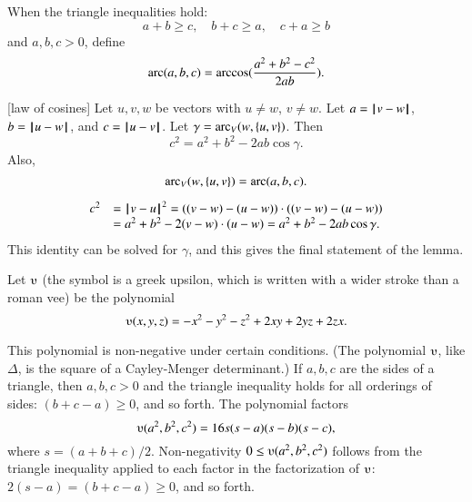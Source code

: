 
\begin{definition}[arc]
When the triangle inequalities hold:
$$
a + b \ge c,\quad b + c \ge a, \quad c+a \ge b
$$
and $a,b,c >0$, define
 $$\operatorname{arc}(a,b,c) = \arccos(\frac{a^2 + b^2 - c^2}{2 a b}).$$
%
\end{definition}

\begin{lemma}[law of cosines]
Let $u,v,w$ be vectors with $u\ne w$, $v\ne w$.  Let $a
    = {\hskip0.1em|\hskip-0.15em|\hskip0.1em}v  -  w{\hskip0.1em|\hskip-0.15em|\hskip0.1em}$, $b = {\hskip0.1em|\hskip-0.15em|\hskip0.1em}u  -  w{\hskip0.1em|\hskip-0.15em|\hskip0.1em}$, and $c = {\hskip0.1em|\hskip-0.15em|\hskip0.1em}u  -  v{\hskip0.1em|\hskip-0.15em|\hskip0.1em}$.
    Let $\gamma=\operatorname{arc}_V(w,\{u,v\})$.    Then
        $$c^2 = a^2 + b^2 - 2 a b \cos\gamma.$$
Also,
$$
\operatorname{arc}_V(w,\{u,v\})= \operatorname{arc}(a,b,c).
$$

\end{lemma}
%
%
%
%
\begin{proved}
    $$\begin{array}{lll}c^2 &= {\hskip0.1em|\hskip-0.15em|\hskip0.1em}v  -  u{\hskip0.1em|\hskip-0.15em|\hskip0.1em}^2 = ((v - w) - (u - w))\cdot ((v - w) - (u -
    w)) \\ &= a^2 + b^2 - 2 (v - w)\cdot (u - w) = a^2 +b ^2 - 2 a b
    \cos\gamma.
    \end{array}$$
This identity can be solved for $\gamma$, and this gives the final statement of the lemma.
\swallowed\end{proved}


\begin{definition}[$\ups$]\label{def:ups}
Let $\ups$ (the symbol is a greek upsilon, which is written with a
wider stroke than a roman vee) be the polynomial
    $$\ups(x,y,z) = -x^2 - y^2 - z^2 + 2 x y + 2 y z + 2 z x.$$
%
\end{definition}



This polynomial is non-negative under certain conditions. (The polynomial
$\ups$, like $\Delta$, 
is the square of a Cayley-Menger determinant.)  
If $a,b,c$ are the sides of a triangle, then $a,b,c>0$ and the triangle
inequality holds for all orderings of sides: $(b+c-a)\ge 0$, and so forth.
The polynomial factors
    $$\ups(a^2,b^2,c^2) = 16 s (s-a) (s-b) (s-c),$$
where $s = (a+b+c)/2$.
Non-negativity $0\le
\ups(a^2,b^2,c^2)$ follows from the triangle inequality applied to
each factor in the factorization of $\ups$: $2(s-a) = (b+c-a) \ge0$, and
so forth.  
%
%


